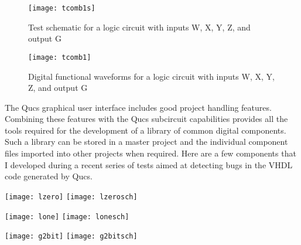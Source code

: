 \begin{figure}
  \centering
  \texttt{[image: tcomb1s]}
  \caption{Test schematic for a logic circuit with inputs W, X, Y, Z, and output G}
  \label{fig:tcomb1s}
\end{figure}
\FloatBarrier

\begin{figure}
  \centering
  \texttt{[image: tcomb1]}
  \caption{Digital functional waveforms for a logic circuit with inputs W, X, Y, Z, and output G}
  \label{fig:tcomb1}
\end{figure}
\FloatBarrier


The Qucs graphical user interface includes good project handling
features.  Combining these features with the Qucs subcircuit
capabilities provides all the tools required for the development of a
library of common digital components.  Such a library can be stored in
a master project and the individual component files imported into
other projects when required.  Here are a few components that I
developed during a recent series of tests aimed at detecting bugs in
the VHDL code generated by Qucs.


\begin{flushleft}
  \texttt{[image: lzero]} \hspace{10mm} \texttt{[image: lzerosch]}

\end{flushleft}


\begin{flushleft}
  \texttt{[image: lone]} \hspace{10mm} \texttt{[image: lonesch]}
\end{flushleft}


\begin{center}
  \texttt{[image: g2bit]}  
  \texttt{[image: g2bitsch]}
\end{center}

